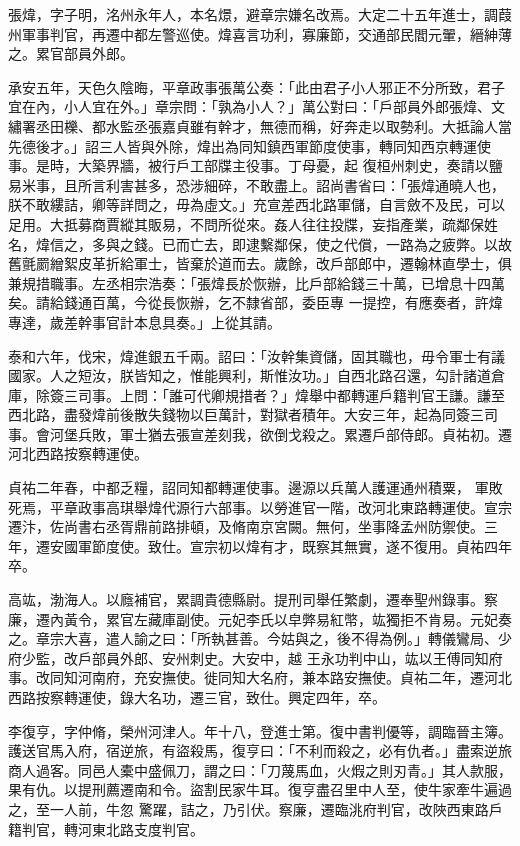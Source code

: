 \begin{pinyinscope}
 張煒，字子明，洺州永年人，本名燝，避章宗嫌名改焉。大定二十五年進士，調葭州軍事判官，再遷中都左警巡使。煒喜言功利，寡廉節，交通部民閻元翬，縉紳薄之。累官部員外郎。



 承安五年，天色久陰晦，平章政事張萬公奏：「此由君子小人邪正不分所致，君子宜在內，小人宜在外。」章宗問：「孰為小人？」萬公對曰：「戶部員外郎張煒、文繡署丞田櫟、都水監丞張嘉貞雖有幹才，無德而稱，好奔走以取勢利。大抵論人當先德後才。」詔三人皆與外除，煒出為同知鎮西軍節度使事，轉同知西京轉運使事。是時，大築界牆，被行戶工部牒主役事。丁母憂，起
 復桓州刺史，奏請以鹽易米事，且所言利害甚多，恐涉細碎，不敢盡上。詔尚書省曰：「張煒通曉人也，朕不敢縷詰，卿等詳問之，毋為虛文。」充宣差西北路軍儲，自言斂不及民，可以足用。大抵募商賈縱其販易，不問所從來。姦人往往投牒，妄指產業，疏鄰保姓名，煒信之，多與之錢。已而亡去，即逮繫鄰保，使之代償，一路為之疲弊。以故舊氈罽繒絮皮革折給軍士，皆棄於道而去。歲餘，改戶部郎中，遷翰林直學士，俱兼規措職事。左丞相宗浩奏：「張煒長於恢辦，比戶部給錢三十萬，已增息十四萬矣。請給錢通百萬，今從長恢辦，乞不隸省部，委臣專
 一提控，有應奏者，許煒專達，歲差幹事官計本息具奏。」上從其請。



 泰和六年，伐宋，煒進銀五千兩。詔曰：「汝幹集資儲，固其職也，毋令軍士有議國家。人之短汝，朕皆知之，惟能興利，斯惟汝功。」自西北路召還，勾計諸道倉庫，除簽三司事。上問：「誰可代卿規措者？」煒舉中都轉運戶籍判官王謙。謙至西北路，盡發煒前後散失錢物以巨萬計，對獄者積年。大安三年，起為同簽三司事。會河堡兵敗，軍士猶去張宣差刻我，欲倒戈殺之。累遷戶部侍郎。貞祐初。遷河北西路按察轉運使。



 貞祐二年春，中都乏糧，詔同知都轉運使事。邊源以兵萬人護運通州積粟，
 軍敗死焉，平章政事高琪舉煒代源行六部事。以勞進官一階，改河北東路轉運使。宣宗遷汴，佐尚書右丞胥鼎前路排頓，及脩南京宮闕。無何，坐事降孟州防禦使。三年，遷安國軍節度使。致仕。宣宗初以煒有才，既察其無實，遂不復用。貞祐四年卒。



 高竑，渤海人。以廕補官，累調貴德縣尉。提刑司舉任繁劇，遷奉聖州錄事。察廉，遷內黃令，累官左藏庫副使。元妃李氏以皁弊易紅幣，竑獨拒不肯易。元妃奏之。章宗大喜，遣人諭之曰：「所執甚善。今姑與之，後不得為例。」轉儀鸞局、少府少監，改戶部員外郎、安州刺史。大安中，越
 王永功判中山，竑以王傅同知府事。改同知河南府，充安撫使。徙同知大名府，兼本路安撫使。貞祐二年，遷河北西路按察轉運使，錄大名功，遷三官，致仕。興定四年，卒。



 李復亨，字仲脩，榮州河津人。年十八，登進士第。復中書判優等，調臨晉主簿。護送官馬入府，宿逆旅，有盜殺馬，復亨曰：「不利而殺之，必有仇者。」盡索逆旅商人過客。同邑人橐中盛佩刀，謂之曰：「刀蔑馬血，火煆之則刃青。」其人款服，果有仇。以提刑薦遷南和令。盜割民家牛耳。復亨盡召里中人至，使牛家牽牛遍過之，至一人前，牛忽
 驚躍，詰之，乃引伏。察廉，遷臨洮府判官，改陜西東路戶籍判官，轉河東北路支度判官。




\end{pinyinscope}
